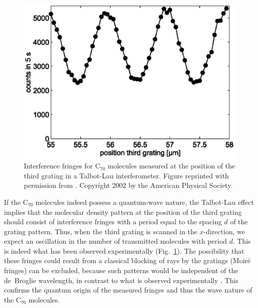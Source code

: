 \documentclass[twocolumn,aps,floatfix,amsmath,amssymb,showpacs,nofootinbib]{revtex4}
\begin{document}
\begin{figure}
\begin{center}
\includegraphics[scale=.37]{c70-scan-n.eps}
\end{center}
\caption[Interference fringes for C$_{70}$
molecules]{\label{fig:c70-scan} Interference fringes for C$_{70}$
  molecules measured at the position of the third grating in a
  Talbot-Lau interferometer. Figure reprinted with permission from
  \cite{Brezger:2002:mu}. Copyright 2002 by the American Physical
  Society.}
\end{figure}

If the C$_{70}$ molecules indeed possess a quantum-wave nature, the
Talbot-Lau effect implies that the molecular density pattern at the
position of the third grating should consist of interference fringes
with a period equal to the spacing $d$ of the grating pattern. Thus,
when the third grating is scanned in the $x$-direction, we expect an
oscillation in the number of transmitted molecules with period $d$.
This is indeed what has been observed experimentally
\cite{Arndt:1999:rc,Arndt:2002:bo,Brezger:2002:mu,Nairz:2003:um,%
Hornberger:2003:tv} (Fig.~\ref{fig:c70-scan}).  The
possibility that these fringes could result from a classical blocking
of rays by the gratings (Moir\'e fringes) can be excluded, because such
patterns would be independent of the de~Broglie wavelength, in
contrast to what is observed experimentally
\cite{Brezger:2002:mu,Hackermuller:2003:uu}.  This confirms the
quantum origin of the measured fringes and thus the wave nature of the
C$_{70}$ molecules.
\end{document}
